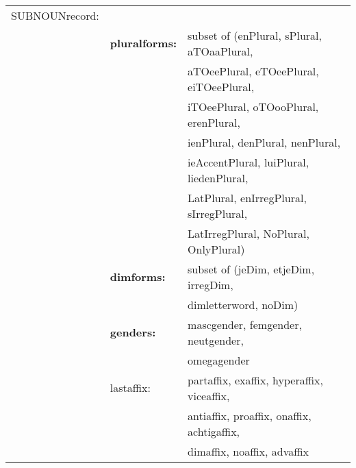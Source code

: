 \\
\begin{tabular}{lll}
SUBNOUNrecord: &               &              \\
             & {\bf pluralforms:} & subset of (enPlural, sPlural, aTOaaPlural,\\
             &                 & aTOeePlural, eTOeePlural, eiTOeePlural,    \\
             &                 & iTOeePlural, oTOooPlural, erenPlural,      \\
             &                 & ienPlural, denPlural, nenPlural,           \\
             &                 & ieAccentPlural, luiPlural, liedenPlural,   \\
             &                 & LatPlural, enIrregPlural, sIrregPlural,    \\
             &                 & LatIrregPlural, NoPlural, OnlyPlural)      \\  
             & {\bf dimforms:} & subset of (jeDim, etjeDim, irregDim, \\
             &                 & dimletterword, noDim)                \\
             & {\bf genders:}  & mascgender, femgender, neutgender,   \\
             &                 & omegagender                           \\
             & lastaffix:      & partaffix, exaffix, hyperaffix, viceaffix,\\
             &                 & antiaffix, proaffix, onaffix, achtigaffix,\\
             &                 & dimaffix,  noaffix, advaffix  \\
\end{tabular}
\\
